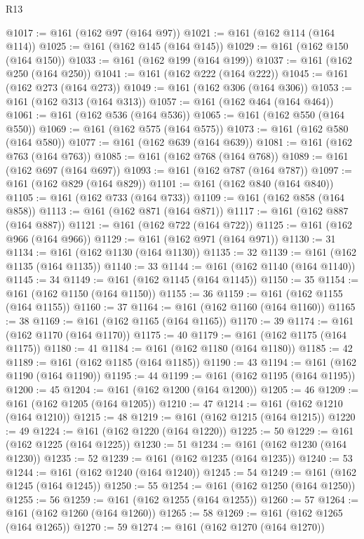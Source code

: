 \begin{lexlean}{R13}
\begin{coremodule}
{{{{{{{{{{{{{{{{{{{{{{{{{{{{{{{{{{{{{{{{{{{{{{{{{{{{{{{{{{{{{{{{{{{{{{{{{{{{{{{{{{{{{{{{{{{{{{{{{{{{{{{{{{@1017 := @161 (@162 @97 (@164 @97))
@1021 := @161 (@162 @114 (@164 @114))
@1025 := @161 (@162 @145 (@164 @145))
@1029 := @161 (@162 @150 (@164 @150))
@1033 := @161 (@162 @199 (@164 @199))
@1037 := @161 (@162 @250 (@164 @250))
@1041 := @161 (@162 @222 (@164 @222))
@1045 := @161 (@162 @273 (@164 @273))
@1049 := @161 (@162 @306 (@164 @306))
@1053 := @161 (@162 @313 (@164 @313))
@1057 := @161 (@162 @464 (@164 @464))
@1061 := @161 (@162 @536 (@164 @536))
@1065 := @161 (@162 @550 (@164 @550))
@1069 := @161 (@162 @575 (@164 @575))
@1073 := @161 (@162 @580 (@164 @580))
@1077 := @161 (@162 @639 (@164 @639))
@1081 := @161 (@162 @763 (@164 @763))
@1085 := @161 (@162 @768 (@164 @768))
@1089 := @161 (@162 @697 (@164 @697))
@1093 := @161 (@162 @787 (@164 @787))
@1097 := @161 (@162 @829 (@164 @829))
@1101 := @161 (@162 @840 (@164 @840))
@1105 := @161 (@162 @733 (@164 @733))
@1109 := @161 (@162 @858 (@164 @858))
@1113 := @161 (@162 @871 (@164 @871))
@1117 := @161 (@162 @887 (@164 @887))
@1121 := @161 (@162 @722 (@164 @722))
@1125 := @161 (@162 @966 (@164 @966))
@1129 := @161 (@162 @971 (@164 @971))
@1130 := 31
@1134 := @161 (@162 @1130 (@164 @1130))
@1135 := 32
@1139 := @161 (@162 @1135 (@164 @1135))
@1140 := 33
@1144 := @161 (@162 @1140 (@164 @1140))
@1145 := 34
@1149 := @161 (@162 @1145 (@164 @1145))
@1150 := 35
@1154 := @161 (@162 @1150 (@164 @1150))
@1155 := 36
@1159 := @161 (@162 @1155 (@164 @1155))
@1160 := 37
@1164 := @161 (@162 @1160 (@164 @1160))
@1165 := 38
@1169 := @161 (@162 @1165 (@164 @1165))
@1170 := 39
@1174 := @161 (@162 @1170 (@164 @1170))
@1175 := 40
@1179 := @161 (@162 @1175 (@164 @1175))
@1180 := 41
@1184 := @161 (@162 @1180 (@164 @1180))
@1185 := 42
@1189 := @161 (@162 @1185 (@164 @1185))
@1190 := 43
@1194 := @161 (@162 @1190 (@164 @1190))
@1195 := 44
@1199 := @161 (@162 @1195 (@164 @1195))
@1200 := 45
@1204 := @161 (@162 @1200 (@164 @1200))
@1205 := 46
@1209 := @161 (@162 @1205 (@164 @1205))
@1210 := 47
@1214 := @161 (@162 @1210 (@164 @1210))
@1215 := 48
@1219 := @161 (@162 @1215 (@164 @1215))
@1220 := 49
@1224 := @161 (@162 @1220 (@164 @1220))
@1225 := 50
@1229 := @161 (@162 @1225 (@164 @1225))
@1230 := 51
@1234 := @161 (@162 @1230 (@164 @1230))
@1235 := 52
@1239 := @161 (@162 @1235 (@164 @1235))
@1240 := 53
@1244 := @161 (@162 @1240 (@164 @1240))
@1245 := 54
@1249 := @161 (@162 @1245 (@164 @1245))
@1250 := 55
@1254 := @161 (@162 @1250 (@164 @1250))
@1255 := 56
@1259 := @161 (@162 @1255 (@164 @1255))
@1260 := 57
@1264 := @161 (@162 @1260 (@164 @1260))
@1265 := 58
@1269 := @161 (@162 @1265 (@164 @1265))
@1270 := 59
@1274 := @161 (@162 @1270 (@164 @1270))
}}}}}}}}}}}}}}}}}}}}}}}}}}}}}}}}}}}}}}}}}}}}}}}}}}}}}}}}}}}}}}}}}}}}}}}}}}}}}}}}}}}}}}}}}}}}}}}}}}}}}}}}}}
\end{coremodule}
\end{lexlean}
